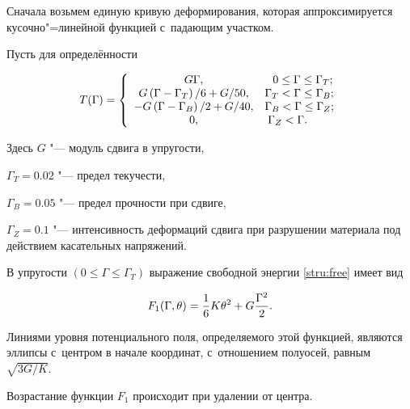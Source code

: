 \smallskip



 Сначала возьмем единую кривую деформирования, которая аппроксимируется кусочно"=линейной функцией с~падающим участком. 

Пусть для определённости 

\begin{equation}

T(\Gamma)=

\left\{

\begin{array}{cl}

G \Gamma, & \text{\;\;\,$0\leq \Gamma \leq \Gamma_T$;} \\

 G\left(\Gamma-\Gamma_T\right) /6 +  G/50, & \text{$\Gamma_T<\Gamma \leq \Gamma_B$;} \\ 

- G\left(\Gamma-\Gamma_B\right)/2+ G/40, & \text{$\Gamma_B<\Gamma \leq \Gamma_Z$;} \\

0, & \text{\;$\Gamma_Z<\Gamma$.} 

\end{array}

\right.

\end{equation}

Здесь $G$ "--- модуль сдвига в упругости, 

$\Gamma_T=0.02$ "--- предел текучести, 

$\Gamma_B=0.05$ "--- предел прочности при сдвиге, 

$\Gamma_Z=0.1$ "--- интенсивность деформаций сдвига при разрушении материала под действием касательных напряжений.



В упругости $(0\leq \Gamma \leq \Gamma_T)$ выражение свободной энергии \eqref{stru:free} имеет вид

\begin{equation}

F_1 (\Gamma, \theta)=\frac16 K\theta^2+G\frac{\Gamma^2}{2}. \notag

\end{equation}

Линиями уровня потенциального поля, определяемого этой функцией, являются эллипсы с~центром в начале координат, с~отношением полуосей, равным $\sqrt{3G/ K}$. 

Возрастание функции $F_1$ происходит при удалении от центра. 

